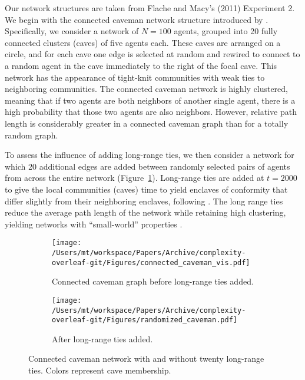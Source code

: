 Our network structures are taken from Flache and
Macy's (2011) Experiment 2. We begin with the connected caveman network
structure introduced by . Specifically, we consider a network of
$N = 100$ agents, grouped into 20 fully connected clusters (caves) of five
agents each. These caves are arranged on a circle, and for each cave one edge
is selected at random and rewired to connect to a random agent in the cave
immediately to the right of the focal cave. This network has the appearance of tight-knit communities with weak ties to neighboring communities. The connected caveman network is highly clustered, meaning that if two agents are both neighbors of another single agent, there is a high probability that those two agents are also neighbors. However, relative path length is considerably greater in a connected caveman graph
than for a totally random graph. 

To assess the influence of adding long-range ties, we then
consider a network for which 20 additional edges are added between randomly
selected pairs of agents from across the entire network (Figure~\ref{fig:network}). 
Long-range ties are added at $t = 2000$ to give the local communities (caves) 
time to yield enclaves of conformity that differ slightly from their neighboring enclaves,
following . The long range ties reduce the average path length of the network while retaining high clustering, yielding networks with ``small-world'' properties \cite{Watts1999}.

\begin{figure}[H]
  \centering
  \begin{subfigure}[t]{0.45\textwidth}
    \centering
    \texttt{[image: /Users/mt/workspace/Papers/Archive/complexity-overleaf-git/Figures/connected\_caveman\_vis.pdf]}
    \caption{Connected caveman graph before long-range ties added.}
  \end{subfigure}
  \begin{subfigure}[t]{0.45\textwidth}
    \centering
    \texttt{[image: /Users/mt/workspace/Papers/Archive/complexity-overleaf-git/Figures/randomized\_caveman.pdf]}
    \caption{After long-range ties added.}
  \end{subfigure}
  \caption{Connected caveman network with and without twenty long-range ties.
    Colors represent cave membership.
  }
  \label{fig:network}
\end{figure}

